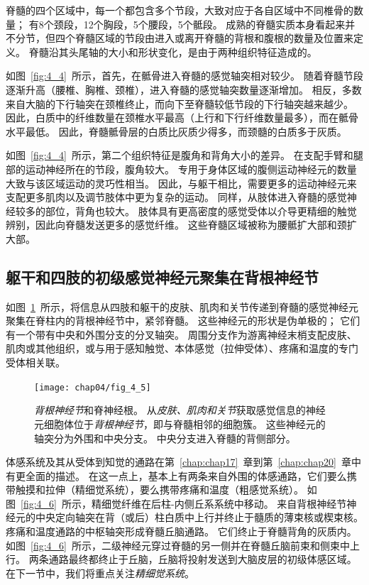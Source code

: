 脊髓的四个区域中，每一个都包含多个节段，大致对应于各自区域中不同椎骨的数量；
有8个颈段，12个胸段，5个腰段，5个骶段。
成熟的脊髓实质本身看起来并不分节，但四个脊髓区域的节段由进入或离开脊髓的背根和腹根的数量及位置来定义。
脊髓沿其头尾轴的大小和形状变化，是由于两种组织特征造成的。


如图~\ref{fig:4_4}~所示，首先，在骶骨进入脊髓的感觉轴突相对较少。
随着脊髓节段逐渐升高（腰椎、胸椎、颈椎），进入脊髓的感觉轴突数量逐渐增加。
相反，多数来自大脑的下行轴突在颈椎终止，而向下至脊髓较低节段的下行轴突越来越少。
因此，白质中的纤维数量在颈椎水平最高（上行和下行纤维数量最多），而在骶骨水平最低。
因此，脊髓骶骨层的白质比灰质少得多，而颈髓的白质多于灰质。


如图~\ref{fig:4_4}~所示，第二个组织特征是腹角和背角大小的差异。
在支配手臂和腿部的运动神经所在的节段，腹角较大。
专用于身体区域的腹侧运动神经元的数量大致与该区域运动的灵巧性相当。
因此，与躯干相比，需要更多的运动神经元来支配更多肌肉以及调节肢体中更为复杂的运动。
同样，从肢体进入脊髓的感觉神经较多的部位，背角也较大。
肢体具有更高密度的感觉受体以介导更精细的触觉辨别，因此向脊髓发送更多的感觉纤维。
这些脊髓区域被称为腰骶扩大部和颈扩大部。



\subsection{躯干和四肢的初级感觉神经元聚集在背根神经节}

如图~\ref{fig:4_5}~所示，将信息从四肢和躯干的皮肤、肌肉和关节传递到脊髓的感觉神经元聚集在脊柱内的背根神经节中，紧邻脊髓。
这些神经元的形状是伪单极的；
它们有一个带有中央和外围分支的分叉轴突。
周围分支作为游离神经末梢支配皮肤、肌肉或其他组织，或与用于感知触觉、本体感觉（拉伸受体）、疼痛和温度的专门受体相关联。


\begin{figure}[htbp]
	\centering
	\texttt{[image: chap04/fig\_4\_5]}
	\caption{\textit{背根神经节}和脊神经根。
		从\textit{皮肤、肌肉和关节}获取感觉信息的神经元细胞体位于\textit{背根神经节}，即与脊髓相邻的细胞簇。
		这些神经元的轴突分为外围和中央分支。 
		中央分支进入脊髓的背侧部分。}
	\label{fig:4_5}
\end{figure}


体感系统及其从受体到知觉的通路在第~\ref{chap:chap17}~章到第~\ref{chap:chap20}~章中有更全面的描述。
在这一点上，基本上有两条来自外围的体感通路，它们要么携带触摸和拉伸（精细觉系统），要么携带疼痛和温度（粗感觉系统）。
如图~\ref{fig:4_6}~所示，精细觉纤维在后柱-内侧丘系系统中移动。
来自背根神经节神经元的中央定向轴突在背（或后）柱白质中上行并终止于髓质的薄束核或楔束核。
疼痛和温度通路的中枢轴突形成脊髓丘脑通路。
它们终止于脊髓背角的灰质内。
如图~\ref{fig:4_6}~所示，二级神经元穿过脊髓的另一侧并在脊髓丘脑前束和侧束中上行。 
两条通路最终都终止于丘脑，丘脑将投射发送到大脑皮层的初级体感区域。
在下一节中，我们将重点关注\textit{精细觉系统}。


